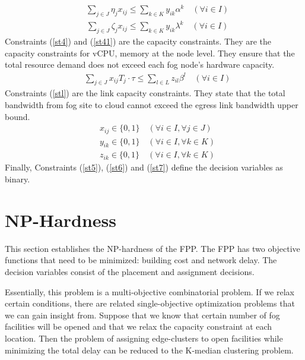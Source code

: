 \documentclass[10pt,journal,compsoc]{IEEEtran}
\newcommand{\Eq}[1]{(\ref{#1})}
\begin{document}
\begin{align}
&\sum_{j\in J} \eta_j x_{ij} \leq \sum_{k\in K} y_{ik}\alpha^k \quad(\forall i \in I)\label{st4}
\end{align}
\begin{align}
&\sum_{j\in J} \zeta_j x_{ij} \leq \sum_{k\in K} y_{ik}\lambda^k \quad(\forall i \in I)\label{st41}
\end{align}
Constraints \Eq{st4} and \Eq{st41} are the capacity constraints. They are the capacity constraints for vCPU, memory at the node level. They ensure that the total resource demand does not exceed each fog node's hardware capacity. %
\begin{align}
&\sum_{j\in J} x_{ij} T_j \cdot \tau \leq \sum_{l\in L} z_{il} \beta^l\quad(\forall i \in I) \label{stl}
\end{align}
Constraints \Eq{stl} are the link capacity constraints. They state that the total bandwidth from fog site to cloud cannot exceed the egress link bandwidth upper bound.\\
\begin{align}
&x_{ij} \in \{0,1\} \quad (\forall i \in I, \forall j \in J)\label{st5}\\
& y_{ik} \in \{0,1\} \quad (\forall i \in I, \forall k \in K)\label{st6}\\
& z_{ik} \in \{0,1\} \quad (\forall i \in I, \forall k \in K)\label{st7}
\end{align}
Finally, Constraints \Eq{st5}, \Eq{st6} and \Eq{st7} define the decision variables as binary.
\section{NP-Hardness}\label{nphard}
This section establishes the NP-hardness of the FPP.
The FPP has two objective functions that need to be minimized: building cost and network delay. The decision variables consist of the placement and assignment decisions. %

Essentially, this problem is a multi-objective combinatorial problem. If we relax certain conditions, there are related single-objective optimization problems that we can gain insight from.
Suppose that we know that certain number of fog facilities will be opened and that we relax the capacity constraint at each location. Then the problem of assigning edge-clusters to open facilities while minimizing the total delay can be reduced to the K-median clustering problem.
\end{document}
